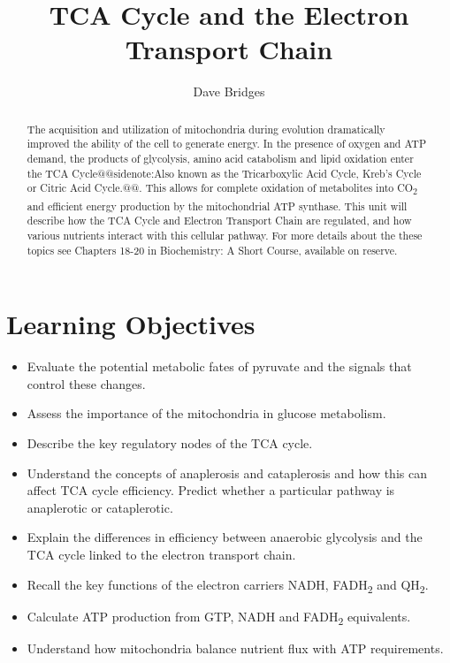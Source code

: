 \documentclass{tufte-handout}
\title{TCA Cycle and the Electron Transport Chain}
\author{Dave Bridges}
\makeatletter
\def\sidenote#1{@@sidenote:#1@@}
\makeatother
\begin{document}
\maketitle%

\begin{abstract}
\noindent The acquisition and utilization of mitochondria during evolution dramatically improved the ability of the cell to generate energy.  In the presence of oxygen and ATP demand, the products of glycolysis, amino acid catabolism and lipid oxidation enter the TCA Cycle\sidenote{Also known as the Tricarboxylic Acid Cycle, Kreb's Cycle or Citric Acid Cycle.}.  This allows for complete oxidation of metabolites into CO\textsubscript{2} and efficient energy production by the mitochondrial ATP synthase.  This unit will describe how the TCA Cycle and Electron Transport Chain are regulated, and how various nutrients interact with this cellular pathway.  For more details about the these topics see Chapters 18-20 in Biochemistry: A Short Course\cite{Berg2015}, available on reserve.
\end{abstract}
\tableofcontents
\pagebreak
\pagebreak{}
\section{Learning Objectives}

\begin{itemize}
\item Evaluate the potential metabolic fates of pyruvate and the signals that control these changes.
\item Assess the importance of the mitochondria in glucose metabolism.
\item Describe the key regulatory nodes of the TCA cycle.
\item Understand the concepts of anaplerosis and cataplerosis and how this can affect TCA cycle efficiency.  Predict whether a particular pathway is anaplerotic or cataplerotic.
\item Explain the differences in efficiency between anaerobic glycolysis and the TCA cycle linked to the electron transport chain.
\item Recall the key functions of the electron carriers NADH, FADH\textsubscript{2} and QH\textsubscript{2}.
\item Calculate ATP production from GTP, NADH and FADH\textsubscript{2} equivalents.
\item Understand how mitochondria balance nutrient flux with ATP requirements.
\end{itemize}
\end{document}

